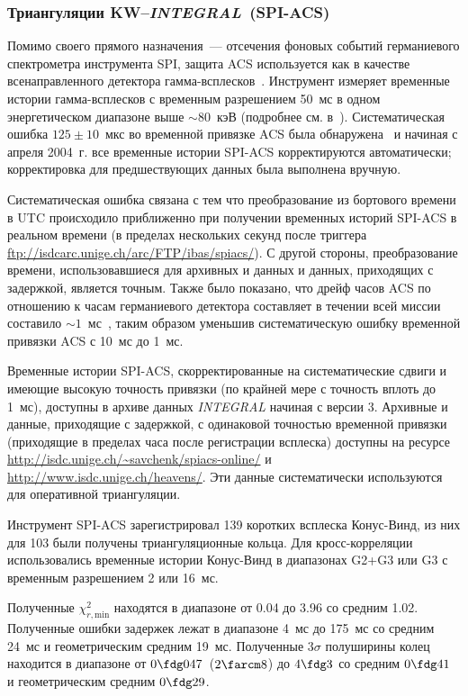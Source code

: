 \subsubsection{Триангуляции KW--\textit{INTEGRAL}~(SPI-ACS)}
Помимо своего прямого назначения~--- отсечения фоновых событий германиевого 
спектрометра инструмента SPI, защита ACS используется как в качестве всенаправленного 
детектора гамма-всплесков~\citep{von_Kienlin_2003AA}. Инструмент измеряет временные 
истории гамма-всплесков с временным разрешением 50~мс в одном энергетическом 
диапазоне выше $\sim 80$~кэВ (подробнее см. в~\citep{Lichti_2000AIPC}). 
Систематическая ошибка $125\pm10$~мкс во временной привязке ACS была обнаружена~\citep{Rau_2004GCN} 
и начиная с апреля 2004~г. все временные истории SPI-ACS корректируются автоматически; 
корректировка для предшествующих данных была выполнена вручную.

Систематическая ошибка связана с тем что преобразование из бортового времени в UTC 
происходило приближенно при получении временных историй SPI-ACS в реальном времени 
(в пределах нескольких секунд после триггера \url{ftp://isdcarc.unige.ch/arc/FTP/ibas/spiacs/}). 
С другой стороны, преобразование времени, использовавшиеся для архивных и данных и данных, 
приходящих с задержкой, является точным. Также было показано, что дрейф часов ACS 
по отношению к часам германиевого детектора составляет в течении всей миссии 
составило $\sim 1$~мс~\citep{Zhang_2010int}, таким образом уменьшив систематическую 
ошибку временной привязки ACS с 10~мс до 1~мс.

Временные истории SPI-ACS, скорректированные на систематические сдвиги и имеющие 
высокую точность привязки (по крайней мере с точность вплоть до 1~мс), доступны 
в архиве данных \textit{INTEGRAL} начиная с версии 3. Архивные и данные, приходящие 
с задержкой, с одинаковой точностью временной привязки (приходящие в пределах 
часа после регистрации всплеска) доступны на ресурсе 
\url{http://isdc.unige.ch/~savchenk/spiacs-online/} и 
\url{http://www.isdc.unige.ch/heavens/}. 
Эти данные систематически используются для оперативной триангуляции.

Инструмент SPI-ACS зарегистрировал 139 коротких всплеска Конус-Винд, из них 
для 103 были получены триангуляционные кольца. Для кросс-корреляции использовались 
временные истории Конус-Винд в диапазонах G2+G3 или G3 с временным разрешением 2 или 16~мс.

Полученные $\chi^2_{r,\textrm{min}}$ находятся в диапазоне от 0.04 до 3.96 со средним 1.02. 
Полученные ошибки задержек лежат в диапазоне 4~мс до 175~мс со средним 24~мс 
и геометрическим средним 19~мс. Полученные $3\sigma$ полуширины колец находится 
в диапазоне от $0\fdg047$~($2\farcm8$) до $4\fdg3$ 
со средним $0\fdg41$ и геометрическим средним $0\fdg29$.

